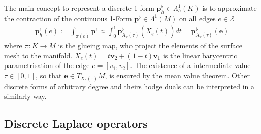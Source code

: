 \documentclass[a4paper,11pt]{scrartcl}
\newcommand{\M}{M}
\newcommand{\pfl}{\mathbf{p}^{\flat}}
\newcommand{\pflh}{\mathbf{p}^{\flat}_{h}}
\newcommand{\E}{\mathcal{E}}
\newcommand{\e}{\mathbf{e}}
\renewcommand{\v}{\mathbf{v}}
\begin{document}
  The main concept to represent a discrete 1-form \( \pflh\in\Lambda_{h}^{1}(K) \) is to approximate the contraction of the continuous 1-Form 
  \( \pfl\in\Lambda^{1}(M) \) on all edges \( e\in\E \)
  \begin{align}
    \pflh(e) := \int_{\pi(e)}\pfl \approx \int_{0}^{1} \pfl_{X_{e}(\tau)}\left( \dot{X}_{e}(t) \right) dt = \pfl_{X_{e}(\tau)}(\e)
  \end{align}
  where \( \pi:K\rightarrow \M \) is the glueing map, who project the elements of the surface mesh to the manifold.
  \( X_{e}(t) = t\v_{2} + (1-t)\v_{1} \) is the linear barycentric parametrisation of the edge \( e=\left[ v_{1}, v_{2} \right]\).
  The existence of a intermediate value \( \tau\in\left[ 0,1 \right] \), so that \( \e\in T_{X_{e}(\tau)}M \),
  is ensured by the mean value theorem.
  Other discrete forms of arbitrary degree and theirs hodge duals can be interpreted in a similarly way.

  \subsection{Discrete Laplace operators}
    
\end{document}
